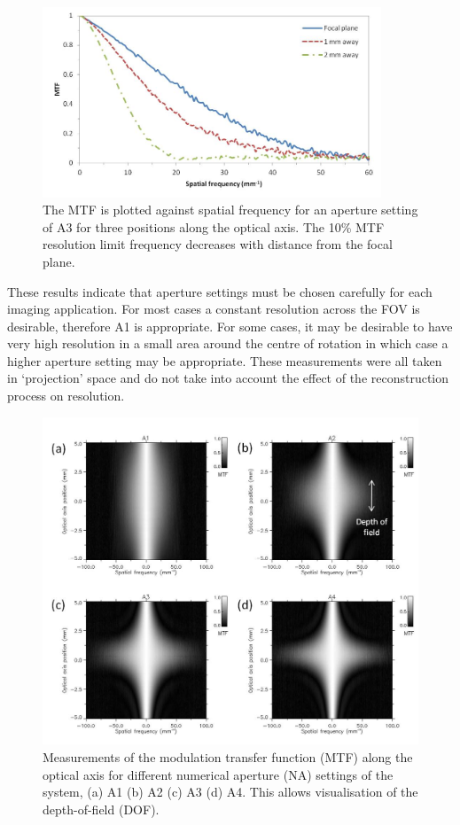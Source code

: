 	\begin{figure}[H]
		\centering
		\includegraphics[width = 0.9\textwidth]{meth_img/MTF_for_A3.jpg}
		\caption{The MTF is plotted against spatial frequency for an aperture setting of A3 for three positions along the optical axis.  The 10\% MTF resolution limit frequency decreases with distance from the focal plane.}
		\label{fig:MTF_50}
	\end{figure}




These results indicate that aperture settings must be chosen carefully for each imaging application. For most cases a constant resolution across the FOV is desirable, therefore A1 is appropriate. For some cases, it may be desirable to have very high resolution in a small area around the centre of rotation in which case a higher aperture setting may be appropriate. 
These measurements were all taken in `projection' space and do not take into account the effect of the reconstruction process on resolution. 




	\begin{figure}[H]
		\centering
		\includegraphics[width=0.9\linewidth]{mrt_img/mrt_Fig6}
		\caption{Measurements of the modulation transfer function (MTF) along the optical axis for different numerical aperture (NA) settings of the system, (a) A1 (b) A2 (c) A3 (d) A4. This allows visualisation of the depth-of-field (DOF).}
		\label{fig:MTFDOF}
	\end{figure}
	
